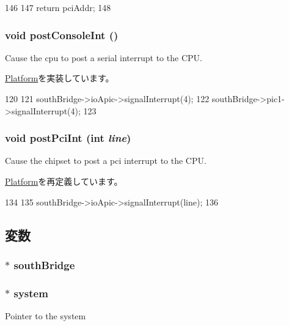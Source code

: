 \begin{DoxyCode}
146 {
147     return pciAddr;
148 }
\end{DoxyCode}
\hypertarget{classPc_a5b278cebc0a62bc2195edf27f059ab1a}{
\subsubsection[{postConsoleInt}]{\setlength{\rightskip}{0pt plus 5cm}void postConsoleInt ()}}
\label{classPc_a5b278cebc0a62bc2195edf27f059ab1a}
Cause the cpu to post a serial interrupt to the CPU. 

\hyperlink{classPlatform_a24ab6780a0fa391b19980027355ba467}{Platform}を実装しています。


\begin{DoxyCode}
120 {
121     southBridge->ioApic->signalInterrupt(4);
122     southBridge->pic1->signalInterrupt(4);
123 }
\end{DoxyCode}
\hypertarget{classPc_a545d1445357706d7259aa73104f44222}{
\subsubsection[{postPciInt}]{\setlength{\rightskip}{0pt plus 5cm}void postPciInt (int {\em line})}}
\label{classPc_a545d1445357706d7259aa73104f44222}
Cause the chipset to post a pci interrupt to the CPU. 

\hyperlink{classPlatform_a545d1445357706d7259aa73104f44222}{Platform}を再定義しています。


\begin{DoxyCode}
134 {
135     southBridge->ioApic->signalInterrupt(line);
136 }
\end{DoxyCode}


\subsection{変数}
\hypertarget{classPc_adeda641729958e9bfeb6f15676275af0}{
\subsubsection[{southBridge}]{$\ast$ {\bf southBridge}}}
\label{classPc_adeda641729958e9bfeb6f15676275af0}
\hypertarget{classPc_af27ccd765f13a4b7bd119dc7579e2746}{
\subsubsection[{system}]{$\ast$ {\bf system}}}
\label{classPc_af27ccd765f13a4b7bd119dc7579e2746}
Pointer to the system 

